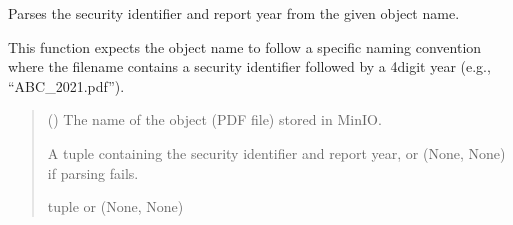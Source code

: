 \documentclass[letterpaper,10pt,english]{sphinxmanual}
\begin{document}

\begin{fulllineitems}
\label{\detokenize{modules.data_storage:modules.data_storage.retry_failed_reports.parse_security_and_year}}
\pysigstartsignatures
\pysiglinewithargsret
{}
{}
{}
\pysigstopsignatures
\sphinxAtStartPar
Parses the security identifier and report year from the given object name.

\sphinxAtStartPar
This function expects the object name to follow a specific naming convention
where the filename contains a security identifier followed by a 4\sphinxhyphen{}digit year
(e.g., “ABC\_2021.pdf”).
\begin{quote}\begin{description}
\sphinxAtStartPar
{} () \textendash{} The name of the object (PDF file) stored in MinIO.

\sphinxAtStartPar
A tuple containing the security identifier and report year,
or (None, None) if parsing fails.

\sphinxAtStartPar
tuple or (None, None)

\end{description}\end{quote}

\end{fulllineitems}

\end{document}
